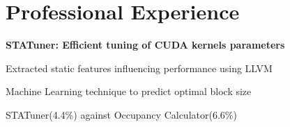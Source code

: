 \documentclass[letterpaper]{deedy-resume}
\begin{document}
\begin{minipage}[t]{0.66\textwidth} %



\section{Professional Experience}


\sectionspace %
\textbf{STATuner: Efficient tuning of CUDA kernels parameters }
\vspace{\topsep} %
\begin{tightitemize}
\item Extracted static features influencing performance using LLVM  
\item Machine Learning technique to predict optimal block size 
\item STATuner(4.4\%) against Occupancy Calculator(6.6\%)  
\end{tightitemize}
\sectionspace %



\end{minipage}
\end{document}
